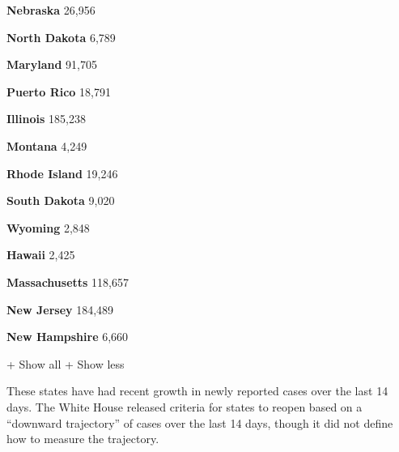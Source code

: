 \textbf{Nebraska} 26,956

\href{https://www.nytimes.com/interactive/2020/us/north-dakota-coronavirus-cases.html}{}

\textbf{North Dakota} 6,789

\href{https://www.nytimes.com/interactive/2020/us/maryland-coronavirus-cases.html}{}

\textbf{Maryland} 91,705

\href{https://www.nytimes.com/interactive/2020/us/puerto-rico-coronavirus-cases.html}{}

\textbf{Puerto Rico} 18,791

\href{https://www.nytimes.com/interactive/2020/us/illinois-coronavirus-cases.html}{}

\textbf{Illinois} 185,238

\href{https://www.nytimes.com/interactive/2020/us/montana-coronavirus-cases.html}{}

\textbf{Montana} 4,249

\href{https://www.nytimes.com/interactive/2020/us/rhode-island-coronavirus-cases.html}{}

\textbf{Rhode Island} 19,246

\href{https://www.nytimes.com/interactive/2020/us/south-dakota-coronavirus-cases.html}{}

\textbf{South Dakota} 9,020

\href{https://www.nytimes.com/interactive/2020/us/wyoming-coronavirus-cases.html}{}

\textbf{Wyoming} 2,848

\href{https://www.nytimes.com/interactive/2020/us/hawaii-coronavirus-cases.html}{}

\textbf{Hawaii} 2,425

\href{https://www.nytimes.com/interactive/2020/us/massachusetts-coronavirus-cases.html}{}

\textbf{Massachusetts} 118,657

\href{https://www.nytimes.com/interactive/2020/us/new-jersey-coronavirus-cases.html}{}

\textbf{New Jersey} 184,489

\href{https://www.nytimes.com/interactive/2020/us/new-hampshire-coronavirus-cases.html}{}

\textbf{New Hampshire} 6,660

+ Show all + Show less

These states have had recent growth in newly reported cases over the
last 14 days. The White House released criteria for states to reopen
based on a ``downward trajectory'' of cases over the last 14 days,
though it did not define how to measure the trajectory.

